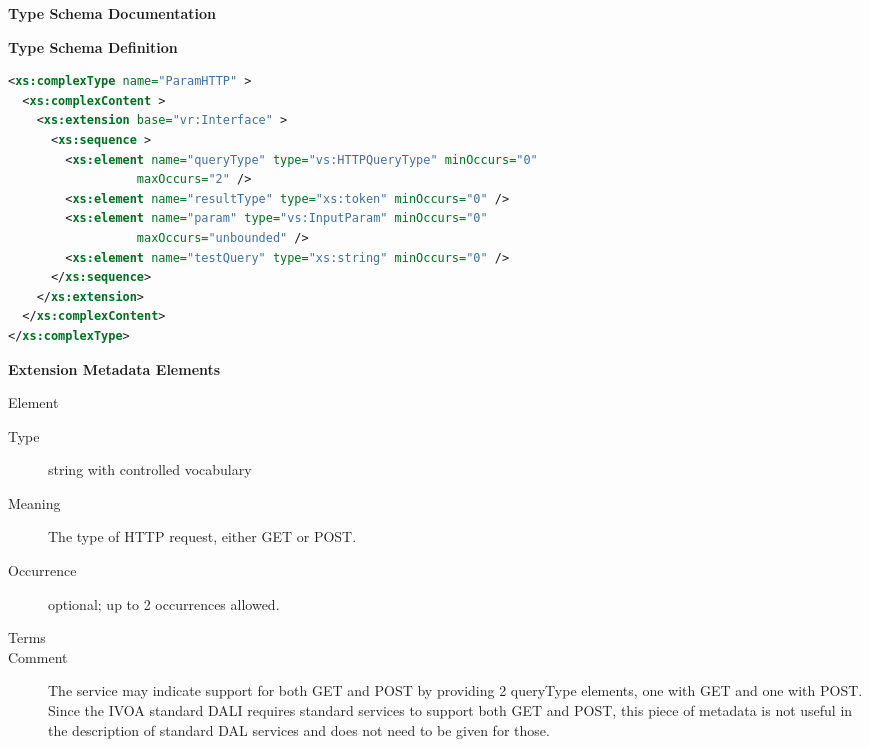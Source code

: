 \documentclass[11pt,a4paper]{ivoa}
\begin{document}
\begin{generated}
\begingroup
        \renewcommand*\descriptionlabel[1]{%
        \hbox to 5.5em{\emph{#1}\hfil}}\vspace{2ex}\noindent\textbf{ Type Schema Documentation}



\vspace{1ex}\noindent\textbf{ Type Schema Definition}

\begin{lstlisting}[language=XML,basicstyle=\footnotesize]
<xs:complexType name="ParamHTTP" >
  <xs:complexContent >
    <xs:extension base="vr:Interface" >
      <xs:sequence >
        <xs:element name="queryType" type="vs:HTTPQueryType" minOccurs="0"
                  maxOccurs="2" />
        <xs:element name="resultType" type="xs:token" minOccurs="0" />
        <xs:element name="param" type="vs:InputParam" minOccurs="0"
                  maxOccurs="unbounded" />
        <xs:element name="testQuery" type="xs:string" minOccurs="0" />
      </xs:sequence>
    </xs:extension>
  </xs:complexContent>
</xs:complexType>
\end{lstlisting}

\vspace{0.5ex}\noindent\textbf{ Extension Metadata Elements}

\begingroup\small\begin{bigdescription}\item[Element \xmlel{queryType}]
\begin{description}
\item[Type] string with controlled vocabulary
\item[Meaning] The type of HTTP request, either GET or POST.
\item[Occurrence] optional; up to 2 occurrences allowed.

\item[Terms]\hfil
\begin{longtermsdescription}
\item[GET]
\item[POST]
\end{longtermsdescription}
\item[Comment] The service may indicate support for both GET
                       and POST by providing 2 queryType elements, one
                       with GET and one with POST.  Since the IVOA standard
                       DALI requires standard services to support both
                       GET and POST, this piece of metadata is not
                       useful in the description of standard DAL services
                       and does not need to be given for those.


\end{description}
\end{bigdescription}
\end{generated}
\end{document}
